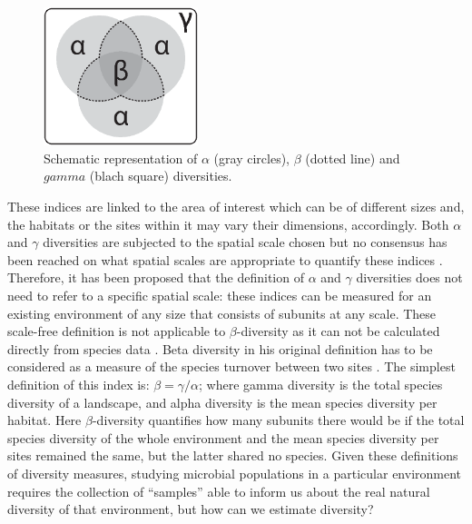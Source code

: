 \begin{figure}[!tb]
	\centering
	\includegraphics[width=0.4\textwidth]{./figures/Introduction/diversities}
  	\caption{Schematic representation of $\alpha$ (gray circles), $\beta$ (dotted line) and $gamma$ (blach square) diversities.\label{fig:diversities}}
\end{figure}%
These indices are linked to the area of interest which can be of different sizes and, the habitats or the sites within it may vary their dimensions, accordingly. Both $\alpha$ and $\gamma$ diversities are subjected to the spatial scale chosen but no consensus has been reached on what spatial scales are appropriate to quantify these indices \cite{whittaker2001scale}. Therefore, it has been proposed that the definition of $\alpha$ and $\gamma$ diversities does not need to refer to a specific spatial scale: these indices can be measured for an existing environment of any size that consists of subunits at any scale. These scale-free definition is not applicable to $\beta$-diversity as it can not be calculated directly from species data \cite{tuomisto2010diversity}. Beta diversity in his original definition has to be considered as a measure of the species turnover between two sites \cite{whittaker1960vegetation}. The simplest definition of this index is: $\beta = \gamma/\alpha$; where gamma diversity is the total species diversity of a landscape, and alpha diversity is the mean species diversity per habitat. Here $\beta$-diversity quantifies how many subunits there would be if the total species diversity of the whole environment and the mean species diversity per sites remained the same, but the latter shared no species. Given these definitions of diversity measures, studying microbial populations in a particular environment requires the collection of ``samples'' able to inform us about the real natural diversity of that environment, but how can we estimate diversity?\\

